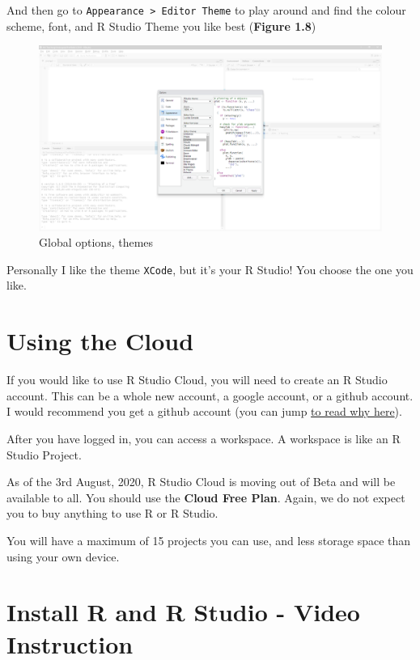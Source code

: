 \documentclass[
]{book}
\begin{document}
And then go to \texttt{Appearance\ \textgreater{}\ Editor\ Theme} to play around and find the colour scheme, font, and R Studio Theme you like best (\textbf{Figure 1.8})

\begin{figure}

{\centering \includegraphics[width=24.94in]{images/02_install/rstud08} 

}

\caption{Global options, themes}\label{fig:unnamed-chunk-16}
\end{figure}

Personally I like the theme \texttt{XCode}, but it's your R Studio! You choose the one you like.

\hypertarget{install_rsc}{%
\section{Using the Cloud}\label{install_rsc}}

If you would like to use R Studio Cloud, you will need to create an R Studio account. This can be a whole new account, a google account, or a github account. I would recommend you get a github account (you can jump \protect\hyperlink{github}{to read why here}).

After you have logged in, you can access a workspace. A workspace is like an R Studio Project.

As of the 3rd August, 2020, R Studio Cloud is moving out of Beta and will be available to all. You should use the \textbf{Cloud Free Plan}. Again, we do not expect you to buy anything to use R or R Studio.

You will have a maximum of 15 projects you can use, and less storage space than using your own device.

\hypertarget{install_vids}{%
\section{Install R and R Studio - Video Instruction}\label{install_vids}}
\end{document}
